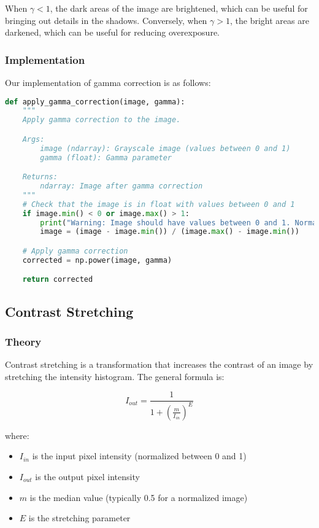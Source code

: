 \documentclass[12pt,a4paper]{article}
\begin{document}
When $\gamma < 1$, the dark areas of the image are brightened, which can be useful for bringing out details in the shadows. Conversely, when $\gamma > 1$, the bright areas are darkened, which can be useful for reducing overexposure.

\subsubsection{Implementation}

Our implementation of gamma correction is as follows:

\begin{lstlisting}[language=Python, caption=Gamma correction implementation]
def apply_gamma_correction(image, gamma):
    """
    Apply gamma correction to the image.

    Args:
        image (ndarray): Grayscale image (values between 0 and 1)
        gamma (float): Gamma parameter

    Returns:
        ndarray: Image after gamma correction
    """
    # Check that the image is in float with values between 0 and 1
    if image.min() < 0 or image.max() > 1:
        print("Warning: Image should have values between 0 and 1. Normalization applied.")
        image = (image - image.min()) / (image.max() - image.min())

    # Apply gamma correction
    corrected = np.power(image, gamma)

    return corrected
\end{lstlisting}

\subsection{Contrast Stretching}

\subsubsection{Theory}

Contrast stretching is a transformation that increases the contrast of an image by stretching the intensity histogram. The general formula is:

\begin{equation}
    I_{out} = \frac{1}{1 + \left(\frac{m}{I_{in}}\right)^E}
\end{equation}

where:
\begin{itemize}
    \item $I_{in}$ is the input pixel intensity (normalized between 0 and 1)
    \item $I_{out}$ is the output pixel intensity
    \item $m$ is the median value (typically 0.5 for a normalized image)
    \item $E$ is the stretching parameter
\end{itemize}
\end{document}
